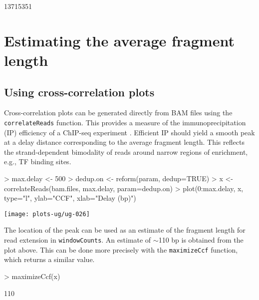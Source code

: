 \documentclass[12pt]{report}
\renewenvironment{Schunk}{\vspace{0pt}}{\vspace{0pt}}
\newcommand{\code}[1]{{\small\texttt{#1}}}
\begin{document}
\begin{Schunk}
\begin{Soutput}
[1] 13715351
\end{Soutput}
\end{Schunk}

\section{Estimating the average fragment length}
\label{sec:ccf}

\subsection{Using cross-correlation plots}
Cross-correlation plots can be generated directly from BAM files using the \code{correlateReads} function. 
This provides a measure of the immunoprecipitation (IP) efficiency of a ChIP-seq experiment \citep{kharchenko2008}. 
Efficient IP should yield a smooth peak at a delay distance corresponding to the average fragment length. 
This reflects the strand-dependent bimodality of reads around narrow regions of enrichment, e.g., TF binding sites. 

\begin{Schunk}
\begin{Sinput}
> max.delay <- 500
> dedup.on <- reform(param, dedup=TRUE)
> x <- correlateReads(bam.files, max.delay, param=dedup.on)
> plot(0:max.delay, x, type="l", ylab="CCF", xlab="Delay (bp)")
\end{Sinput}
\end{Schunk}

\begin{center}
\centering
\texttt{[image: plots-ug/ug-026]}
\end{center}

The location of the peak can be used as an estimate of the fragment length for read extension in \code{windowCounts}. 
An estimate of $\sim$110 bp is obtained from the plot above.
This can be done more precisely with the \code{maximizeCcf} function, which returns a similar value.

\begin{Schunk}
\begin{Sinput}
> maximizeCcf(x)
\end{Sinput}
\begin{Soutput}
[1] 110
\end{Soutput}
\end{Schunk}
\end{document}
